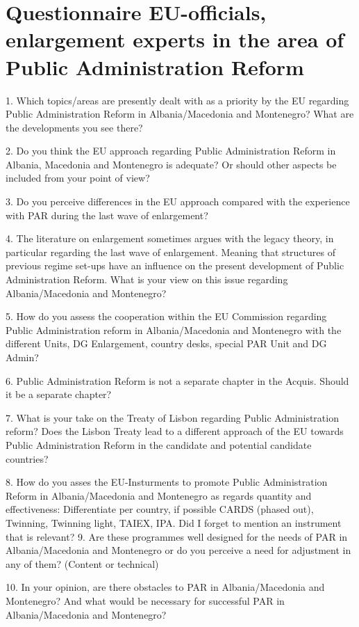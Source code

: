 \chapter[Questionnaire EU-officials, enlargement experts]{Questionnaire EU-officials, enlargement experts in the area of Public Administration Reform }
\label{anhang:Questionnaire EU-officials}
1. Which topics/areas are presently dealt with as a priority by the EU regarding Public Administration Reform in Albania/Macedonia and Montenegro? What are the developments you see there?

2. Do you think the EU approach regarding Public Administration Reform in Albania, Macedonia and Montenegro is adequate? Or should other aspects be included from your point of view?

3. Do you perceive differences in the EU approach compared with the experience with PAR during the last wave of enlargement?

4. The literature on enlargement sometimes argues with the legacy theory, in particular regarding the last wave of enlargement. Meaning that structures of previous regime set-ups have an influence on the present development of Public Administration Reform. What is your view on this issue regarding Albania/Macedonia and Montenegro?

5. How do you assess the cooperation within the EU Commission regarding Public Administration reform in Albania/Macedonia and Montenegro with the different Units, DG Enlargement, country desks, special PAR Unit and DG Admin? 

6. Public Administration Reform is not a separate chapter in the Acquis. Should it be a separate chapter? 

7. What is your take on the Treaty of Lisbon regarding Public Administration reform? Does the Lisbon Treaty lead to a different approach of the EU towards Public Administration Reform in the candidate and potential candidate countries? 

8. How do you asses the EU-Insturments to promote Public Administration Reform in Albania/Macedonia and Montenegro as regards quantity and effectiveness:
Differentiate per country, if possible
CARDS (phased out),
Twinning,
Twinning light,
TAIEX,
IPA.
Did I forget to mention an instrument that is relevant?
9. Are these programmes well designed for the needs of PAR in Albania/Macedonia and Montenegro or do you perceive a need for adjustment in any of them? (Content or technical)


10. In your opinion, are there obstacles to PAR in Albania/Macedonia and Montenegro? And what would be necessary for successful PAR in Albania/Macedonia and Montenegro? 

